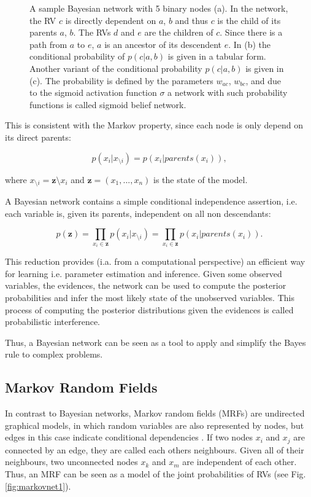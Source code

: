 \begin{figure}
\begin{subfigure}[t]{.33\textwidth}
  		\caption{}
  		\label{fig:sub3}
	\end{subfigure}
	\caption[A sample Bayesian network with 5 binary nodes.]{A sample Bayesian network with 5 binary nodes (a). In the network, the RV $c$ is directly dependent on $a$, $b$ and thus $c$ is the child of its parents $a$, $b$. The RVs $d$ and $e$ are the children of $c$. Since there is a path from $a$ to $e$, $a$ is an ancestor of its descendent $e$. In (b) the conditional probability of $p(c |a , b)$ is given in a tabular form. Another variant of the conditional probability $p(c |a , b)$ is given in (c). The probability is defined by the parameters $w_{ac}$, $w_{bc}$, and due to the sigmoid activation function $\sigma$ a network with such probability functions is called sigmoid belief network.}
	\label{fig:bayesnet}
\end{figure}

This is consistent with the Markov property, since each node is only depend on its direct parents:

\[
p(x_i | x_{\setminus i}) = p(x_i | parents(x_i) ),
\]

where $x_{\setminus i} = \textbf{z} \setminus x_i$ and $\textbf{z} = (x_1, ... , x_n)$ is the state of the model.


A Bayesian network contains a simple conditional independence assertion, i.e. each variable is, given its parents, independent on all non descendants:

\[
p(\textbf{z}) = \prod_{x_i \in \textbf{z}} p(x_i | x_{\setminus i}) = \prod_{x_i \in \textbf{z}} p(x_i | parents(x_i) ) .
\]

This reduction provides (i.a. from a computational perspective) an efficient way for learning i.e. parameter estimation and inference.
Given some observed variables, the evidences, the network can be used to compute the posterior probabilities and infer the most likely state of the unobserved variables.
This process of computing the posterior distributions given the evidences is called probabilistic interference.

Thus, a Bayesian network can be seen as a tool to apply and simplify the Bayes rule to complex problems.   

\subsection{Markov Random Fields} \label{c:markovnet}

In contrast to Bayesian networks, Markov random fields (MRFs) are undirected graphical models, in which random variables are also represented by nodes, but edges in this case indicate conditional dependencies \cite{Goodfellow-et-al-2016-Book, murphy2012machine}.
If two nodes $x_i$ and $x_j$ are connected by an edge, they are called each others neighbours.
Given all of their neighbours, two unconnected nodes $x_k$ and $x_m$ are independent of each other.
Thus, an MRF can be seen as a model of the joint probabilities of RVs (see Fig. \ref{fig:markovnet1}).

